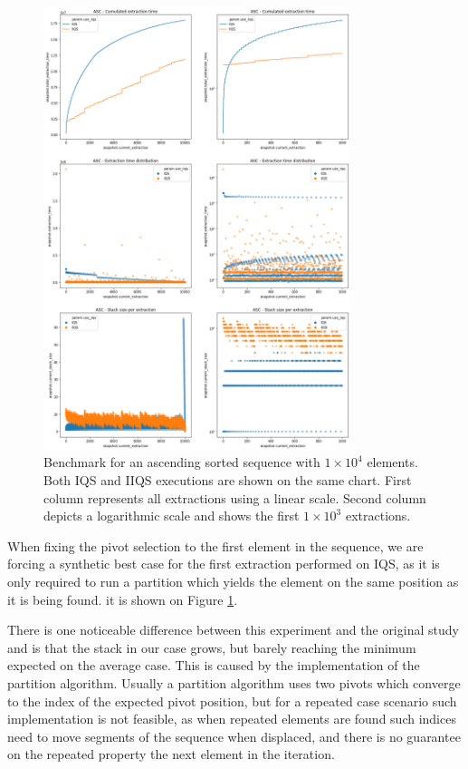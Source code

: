 \begin{figure}[!ht]
    \centering
    \includegraphics[width=0.8\textwidth]{./fragments/04_experimental_execution/images/01_basebenchmark_02_sort_a_case.png}
    \caption{Benchmark for an ascending sorted sequence with $1\times10^4$ elements. Both IQS and IIQS executions are shown on the same chart. First column represents all extractions using a linear scale. Second column depicts a logarithmic scale and shows the first $1\times10^3$ extractions.}
    \label{FIG:BENCHMARK_02_ASC_CASE}
\end{figure}

When fixing the pivot selection to the first element in the sequence, we are forcing a synthetic best case for the first extraction performed on IQS, as it is only required to run a partition which yields the element on the same position as it is being found. it is shown on Figure \ref{FIG:BENCHMARK_02_ASC_CASE}. 

There is one noticeable difference between this experiment and the original study and is that the stack in our case grows, but barely reaching the minimum expected on the average case. This is caused by the implementation of the partition algorithm. Usually a partition algorithm uses two pivots which converge to the index of the expected pivot position, but for a repeated case scenario such implementation is not feasible, as when repeated elements are found such indices need to move segments of the sequence when displaced, and there is no guarantee on the repeated property the next element in the iteration.

